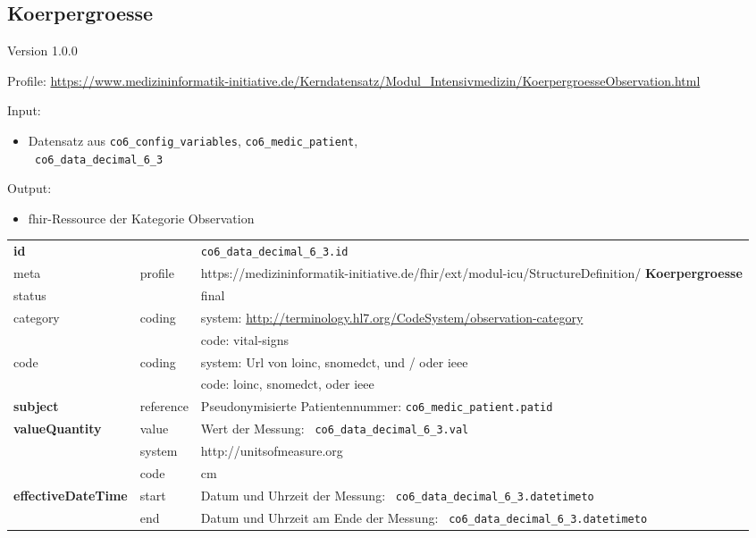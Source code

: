 \subsection{
Koerpergroesse} 
\noindent Version 1.0.0

\noindent Profile: \url{https://www.medizininformatik-initiative.de/Kerndatensatz/Modul_Intensivmedizin/KoerpergroesseObservation.html}

\noindent Input:
\begin{itemize}
	\item Datensatz aus \texttt{co6\_config\_variables}, \texttt{co6\_medic\_patient}, \\ \texttt{
co6\_data\_decimal\_6\_3}
\end{itemize}
Output:
\begin{itemize}
        \item \ac{fhir}-Ressource der Kategorie \glqq Observation\grqq{}
\end{itemize}
\begin{longtable}{|l|l|p{7.5cm}|}
        \hline
        \rowcolor{lightgray} \multicolumn{3}{|l|}{Data Mapping (inhaltlich)} \\ \hline
        \textbf{id} &  & \texttt{co6\_data\_decimal\_6\_3.id} \\ \hline
	meta & profile & https://medizininformatik-initiative.de/fhir/ext/modul-icu/StructureDefinition/\textbf{
Koerpergroesse} \\ \hline 
	status &  & final   \\ \hline 
	category & coding & system: \url{http://terminology.hl7.org/CodeSystem/observation-category} \\
\cline{3-3}
	& & code: vital-signs \\ \hline
	code & coding & system: Url von \ac{loinc}, \ac{snomedct}, und / oder \ac{ieee} \\ 
	\cline{3-3} 
	 &  & code: \ac{loinc}, \ac{snomedct}, oder \ac{ieee} \\ \hline
	 \textbf{subject}  & reference & Pseudonymisierte Patientennummer: \texttt{co6\_medic\_patient.patid} \\ \hline
	 \textbf{valueQuantity}  & value & Wert der Messung: \texttt{
co6\_data\_decimal\_6\_3.val} \\
        \cline{2-3}
         & system & http://unitsofmeasure.org \\
         \cline{2-3}
         & code & cm \\ \hline
     \textbf{effectiveDateTime}  & start & Datum und Uhrzeit der Messung: \texttt{
co6\_data\_decimal\_6\_3.datetimeto} \\
    \cline{2-3}
     & end & Datum und Uhrzeit am Ende der Messung: \texttt{
co6\_data\_decimal\_6\_3.datetimeto} \\ \hline
\end{longtable}


